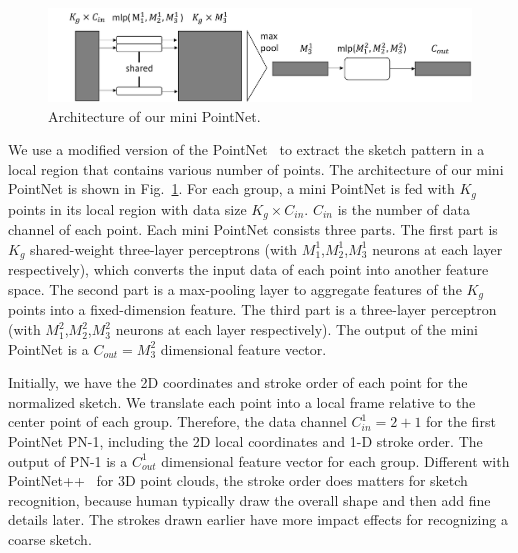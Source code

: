 \begin{figure}
	\centering
	\includegraphics[width=\columnwidth]{images/pointnet.png}
	\caption{Architecture of our mini PointNet.}
	\label{fig:miniPN}
\end{figure}

%
We use a modified version of the PointNet~\cite{qi2017pointnet} to extract the sketch pattern in a local region that contains various number of points.
The architecture of our mini PointNet is shown in Fig.~\ref{fig:miniPN}.
%
%
For each group, a mini PointNet is fed with $K_g$ points in its local region with data size $K_g \times C_{in}$.
$C_{in}$ is the number of data channel of each point.
Each mini PointNet consists three parts.
The first part is $K_g$ shared-weight three-layer perceptrons (with $M^{1}_1$,$M^{1}_2$,$M^{1}_3$ neurons at each layer respectively), which converts the input data of each point into another feature space.
%
The second part is a max-pooling layer to aggregate features of the $K_g$ points into a fixed-dimension feature.
%
The third part is a three-layer perceptron (with $M^{2}_1$,$M^{2}_2$,$M^{2}_3$ neurons at each layer respectively).
%
The output of the mini PointNet is a $C_{out}=M^{2}_3$ dimensional feature vector.


Initially, we have the 2{D} coordinates and stroke order of each point for the normalized sketch.
We translate each point into a local frame relative to the center point of each group.
Therefore, the data channel $C^1_{in}=2+1$ for the first PointNet PN-1, including the 2D local coordinates and 1-D stroke order.
The output of PN-1 is a $C^1_{out}$ dimensional feature vector for each group.
%
Different with PointNet++~\cite{qi2017pointnetplusplus} for 3D point clouds, the stroke order does matters for sketch recognition, because human typically draw the overall shape and then add fine details later.
%
The strokes drawn earlier have more impact effects for recognizing a coarse sketch.
%

